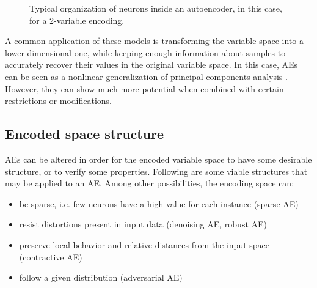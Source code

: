 \begin{figure}[ht]
{

  }
  \caption[Sample autoencoder]{Typical organization of neurons inside an autoencoder, in this case, for a 2-variable encoding.}
  \label{p4fig:ae-example}
\end{figure}

A common application of these models is transforming the variable space into a lower-dimensional one, while keeping enough information about samples to accurately recover their values in the original variable space. In this case, AEs can be seen as a nonlinear generalization of principal components analysis \cite{ANNsPCA}. However, they can show much more potential when combined with certain restrictions or modifications.


\subsection{Encoded space structure}

AEs can be altered in order for the encoded variable space to have some desirable structure, or to verify some properties. Following are some viable structures that may be applied to an AE. Among other possibilities, the encoding space can:  %

\begin{itemize}
    \item be sparse, i.e. few neurons have a high value for each instance (sparse AE)
    \item resist distortions present in input data (denoising AE, robust AE)
    \item preserve local behavior and relative distances from the input space (contractive AE)
    \item follow a given distribution (adversarial AE)
\end{itemize}

